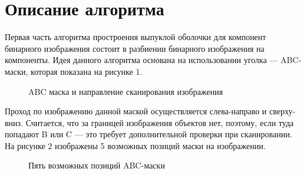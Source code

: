 \documentclass{report}
\begin{document}
\section*{Описание алгоритма}
Первая часть алгоритма простроения выпуклой оболочки для компонент бинарного изображения состоит в разбиении бинарного изображения на компоненты. Идея данного алгоритма основана на использовании уголка — ABC-маски, которая показана на рисунке 1. 
\begin{figure}[H]
\caption{ABC маска и направление сканирования изображения}
\end{figure}
Проход по изображению данной маской осуществляется слева-направо и сверху-вниз. Считается, что за границей изображения объектов нет, поэтому, если туда попадают B или C — это требует дополнительной проверки при сканировании. На рисунке 2 изображены 5 возможных позиций маски на изображении.
\begin{figure}[H]
\caption{Пять возможных позиций ABC-маски}
\end{figure}
\end{document}
